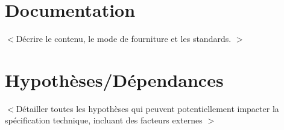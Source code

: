 \documentclass{scrreprt}
\begin{document}
\section{Documentation}
$<$Décrire le contenu, le mode de fourniture et les standards. $>$

\section{Hypothèses/Dépendances}
$<$Détailler toutes les hypothèses qui peuvent potentiellement impacter la spécification technique, incluant des facteurs externes $>$




% 



\end{document}
